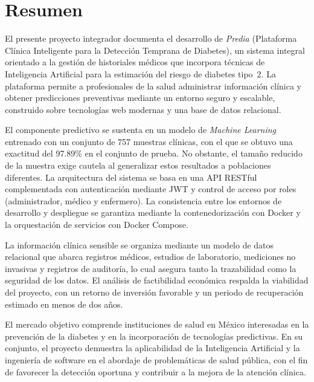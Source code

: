 \documentclass[12pt, letterpaper, twoside]{report}
\begin{document}
\cleardoublepage
{}

\cleardoublepage
{}
{}
\chapter*{Resumen}

El presente proyecto integrador documenta el desarrollo de \textit{Predia} (Plataforma Clínica Inteligente para la Detección Temprana de Diabetes), un sistema integral orientado a la gestión de historiales médicos que incorpora técnicas de Inteligencia Artificial para la estimación del riesgo de diabetes tipo~2. La plataforma permite a profesionales de la salud administrar información clínica y obtener predicciones preventivas mediante un entorno seguro y escalable, construido sobre tecnologías web modernas y una base de datos relacional.

El componente predictivo se sustenta en un modelo de \textit{Machine Learning} entrenado con un conjunto de 757 muestras clínicas, con el que se obtuvo una exactitud del 97.89\% en el conjunto de prueba. No obstante, el tamaño reducido de la muestra exige cautela al generalizar estos resultados a poblaciones diferentes. La arquitectura del sistema se basa en una API RESTful complementada con autenticación mediante JWT y control de acceso por roles (administrador, médico y enfermero). La consistencia entre los entornos de desarrollo y despliegue se garantiza mediante la contenedorización con Docker y la orquestación de servicios con Docker Compose.

La información clínica sensible se organiza mediante un modelo de datos relacional que abarca registros médicos, estudios de laboratorio, mediciones no invasivas y registros de auditoría, lo cual asegura tanto la trazabilidad como la seguridad de los datos. El análisis de factibilidad económica respalda la viabilidad del proyecto, con un retorno de inversión favorable y un periodo de recuperación estimado en menos de dos años.

El mercado objetivo comprende instituciones de salud en México interesadas en la prevención de la diabetes y en la incorporación de tecnologías predictivas. En su conjunto, el proyecto demuestra la aplicabilidad de la Inteligencia Artificial y la ingeniería de software en el abordaje de problemáticas de salud pública, con el fin de favorecer la detección oportuna y contribuir a la mejora de la atención clínica.
\end{document}
